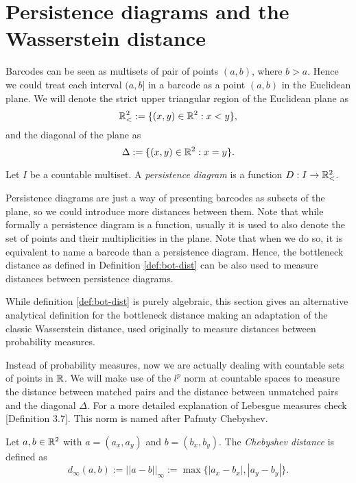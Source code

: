 \section{Persistence diagrams and the Wasserstein distance} \label{sec:preliminaries-wp-persistance}

Barcodes can be seen as multisets of pair of points $ (a, b) $, where $ b > a $. Hence we could treat each interval $ (a, b] $ in a barcode as a point $ (a, b) $ in the Euclidean plane. We will denote the strict upper triangular region of the Euclidean plane as
\begin{equation}
   \mathbb{R}_<^2 := \{(x, y) \in \mathbb R^2 : x < y\}, 
\end{equation}
and the diagonal of the plane as
\begin{equation}
    \Delta := \{(x, y) \in \mathbb R^2 : x = y\}.
\end{equation}

\begin{definition}
    Let $ I $ be a countable multiset. A {\it persistence diagram} is a function $ D: I \to \mathbb{R}_<^2 $.
\end{definition}

Persistence diagrams are just a way of presenting barcodes as subsets of the plane, so we could introduce more distances between them. Note that while formally a persistence diagram is a function, usually it is used to also denote the set of points and their multiplicities in the plane. Note that when we do so, it is equivalent to name a barcode than a persistence diagram. Hence, the bottleneck distance as defined in Definition \ref{def:bot-dist} can be also used to measure distances between persistence diagrams.

While definition \ref{def:bot-dist} is purely algebraic, this section gives an alternative analytical definition for the bottleneck distance making an adaptation of the classic Wasserstein distance, used originally to measure distances between probability measures.

Instead of probability measures, now we are actually dealing with countable sets of points in $ \mathbb R $. We will make use of the $ l^p $ norm at countable spaces to measure the distance between matched pairs and the distance between unmatched pairs and the diagonal $ \Delta $. For a more detailed explanation of Lebesgue measures check \cite{rudin}[Definition 3.7]. This norm is named after Pafnuty Chebyshev.

\begin{definition}
    Let $ a, b \in \mathbb R^2 $ with $a = (a_x, a_y) $ and $ b = (b_x, b_y) $. The {\it Chebyshev distance} is defined as
    \begin{equation}
        d_\infty(a, b) := ||a-b||_{\infty} := \max \{|a_x - b_x|, |a_y - b_y|\}.
    \end{equation}
\end{definition}

